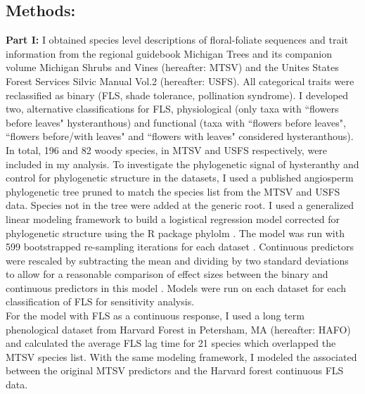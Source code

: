\documentclass{article}\usepackage[]{graphicx}\usepackage[]{color}
\begin{document}
\subsection*{Methods:}
\indent\indent\textbf{Part I:} I obtained species level descriptions of floral-foliate sequences and trait information from the regional guidebook Michigan Trees \citep{Barnes2004} and its companion volume Michigan Shrubs and Vines \citep{Barnes2016} (hereafter: MTSV) and the Unites States Forest Services Silvic Manual Vol.2 \citep{Burns1990} (hereafter: USFS). All categorical traits were reclassified as binary (FLS, shade tolerance, pollination syndrome). I developed two, alternative classifications for FLS, physiological (only taxa with ``flowers before leaves" hysteranthous) and functional (taxa with ``flowers before leaves", ``flowers before/with leaves" and ``flowers with leaves" considered hysteranthous). In total, 196 and 82 woody species, in MTSV and USFS respectively, were included in my analysis. To investigate the phylogenetic signal of hysteranthy and control for phylogenetic structure in the datasets, I used a published angiosperm phylogenetic tree \citep{Zanne2013} pruned to match the species list from the MTSV and USFS data. Species not in the tree were added at the generic root. I used  a generalized linear modeling framework \citep{Ives2010} to build a logistical regression model corrected for phylogenetic structure using the R package phylolm \citep{Ho2014}. The model was run with 599 bootstrapped re-sampling iterations for each dataset \citep{Wilcox2010}. Continuous predictors were rescaled by subtracting the mean and dividing by two standard deviations to allow for a reasonable comparison of effect sizes between the binary and continuous predictors in this model \citep{Gelman2007}. Models were run on each dataset for each classification of FLS for sensitivity analysis.\\ 
\indent For the model with FLS as a continuous response, I used a long term phenological dataset from Harvard Forest in Petersham, MA \citep{Okeefe2015} (hereafter: HAFO)  and calculated the average FLS lag time for 21 species which overlapped the MTSV species list. With the same modeling framework, I modeled the associated between the original MTSV predictors and the Harvard forest continuous FLS data.\\
\end{document}
